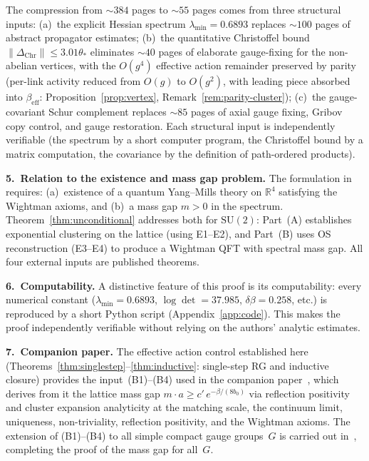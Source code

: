 \documentclass[11pt]{article}
\theoremstyle{definition}
\newcommand{\SU}{\mathrm{SU}}
\newcommand{\R}{\mathbb{R}}
\begin{document}
\noindent The compression from ${\sim}384$ pages to ${\sim}55$ pages
comes from three structural inputs: (a)~the explicit Hessian spectrum
$\lambda_{\min}=0.6893$ replaces ${\sim}100$ pages of abstract
propagator estimates; (b)~the quantitative Christoffel bound
$\|\Delta_{\mathrm{Chr}}\|\le 3.01\theta_*$ eliminates ${\sim}40$ pages
of elaborate gauge-fixing for the non-abelian vertices, with the
$O(g^4)$ effective action remainder preserved by parity
(per-link activity reduced from $O(g)$ to $O(g^2)$,
with leading piece absorbed into $\beta_{\mathrm{eff}}$:
Proposition~\ref{prop:vertex}, Remark~\ref{rem:parity-cluster});
(c)~the gauge-covariant Schur complement replaces ${\sim}85$ pages
of axial gauge fixing, Gribov copy control, and gauge restoration.
Each structural input is independently verifiable (the spectrum by a
short computer program, the Christoffel bound by a matrix computation,
the covariance by the definition of path-ordered products).

\medskip\noindent\textbf{5.~Relation to the existence and mass gap problem.}
The formulation in~\cite{JaffeWitten} requires:
(a)~existence of a quantum Yang--Mills theory on $\R^4$ satisfying the
Wightman axioms, and (b)~a mass gap $m>0$ in the spectrum.
Theorem~\ref{thm:unconditional} addresses both for $\SU(2)$:
Part~(A) establishes exponential clustering on the lattice
(using E1--E2), and Part~(B) uses OS reconstruction
(E3--E4) to produce a Wightman QFT with spectral mass gap.
All four external inputs are published theorems.

\medskip\noindent\textbf{6.~Computability.}
A distinctive feature of this proof is its computability: every
numerical constant ($\lambda_{\min}=0.6893$, $\log\det=37.985$,
$\delta\beta=0.258$, etc.) is reproduced by a short Python script
(Appendix~\ref{app:code}).  This makes the proof independently
verifiable without relying on the authors' analytic estimates.

\medskip\noindent\textbf{7.~Companion paper.}
The effective action control established here
(Theorems~\ref{thm:singlestep}--\ref{thm:inductive}: single-step
RG and inductive closure) provides the input~(B1)--(B4) used in the
companion paper~\cite{FontesSynthesis}, which derives from it the
lattice mass gap $m\cdot a\ge c'\,e^{-\beta/(8b_0)}$ via reflection
positivity and cluster expansion analyticity at the matching scale,
the continuum limit, uniqueness, non-triviality, reflection positivity,
and the Wightman axioms.
The extension of (B1)--(B4) to all simple compact gauge
groups~$G$ is carried out in~\cite{FontesSUN}, completing
the proof of the mass gap for all~$G$.
\end{document}
